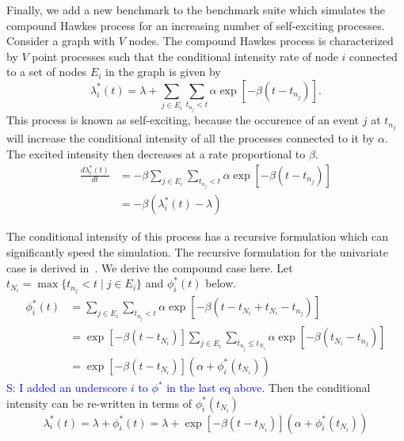 \documentclass{juliacon}
\newcommand{\comment}[1]{\textcolor{blue}{#1}}
\begin{document}
Finally, we add a new benchmark to the benchmark suite which simulates the compound Hawkes process for an increasing number of self-exciting processes. Consider a graph with \( V \) nodes. The compound Hawkes process is characterized by \( V \) point processes such that the conditional intensity rate of node \( i \) connected to a set of nodes \( E_i \) in the graph is given by
\[
  \lambda_i^\ast (t) = \lambda + \sum_{j \in E_i} \sum_{t_{n_j} < t} \alpha \exp \left[-\beta (t - t_{n_j}) \right].
\]
This process is known as self-exciting, because the occurence of an event \( j \) at \( t_{n_j} \) will increase the conditional intensity of all the processes connected to it by \( \alpha \). The excited intensity then decreases at a rate proportional to \( \beta \).
\[
\begin{split}
  \frac{d \lambda_i^\ast (t)}{d t}
    &= -\beta \sum_{j \in E_i} \sum_{t_{n_j} < t} \alpha \exp \left[-\beta (t - t_{n_j}) \right] \\
    &= -\beta \left( \lambda_i^\ast (t) - \lambda \right)
\end{split}
\]

The conditional intensity of this process has a recursive formulation which can significantly speed the simulation. The recursive formulation for the univariate case is derived in~\cite{laub2021}. We derive the compound case here. Let \( t_{N_i} = \max \{ t_{n_j} < t \mid j \in E_i \} \) and \( \phi_i^\ast (t) \) below.
\[
\begin{split}
  \phi_i^\ast (t)
    &= \sum_{j \in E_i} \sum_{t_{n_j} < t} \alpha \exp \left[-\beta (t - t_{N_i} + t_{N_i} - t_{n_j}) \right] \\
    &= \exp \left[ -\beta (t - t_{N_i}) \right] \sum_{j \in E_i} \sum_{t_{n_j} \leq t_{N_i}} \alpha \exp \left[-\beta (t_{N_i} - t_{n_j}) \right] \\
    &= \exp \left[ -\beta (t - t_{N_i}) \right] \left( \alpha + \phi_i^\ast (t_{N_i}) \right)
\end{split}
\]
\comment{S: I added an underscore $i$ to $\phi^*$ in the last eq above.}
Then the conditional intensity can be re-written in terms of \( \phi_i^\ast (t_{N_i}) \)
\[
  \lambda_i^\ast (t) = \lambda + \phi_i^\ast (t) = \lambda + \exp \left[ -\beta (t - t_{N_i}) \right] \left( \alpha + \phi_i^\ast (t_{N_i}) \right)
\]
\end{document}
